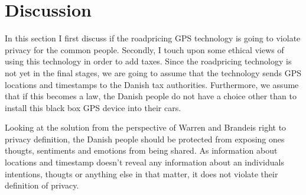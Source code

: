 \section{Discussion}
In this section I first discuss if the roadpricing GPS technology is going to violate privacy for the common people. Secondly, I touch upon some ethical views of using this technology in order to add taxes.
Since the roadpricing technology is not yet in the final stages, we are going to assume that the technology sends GPS locations and timestamps to the Danish tax authorities. Furthermore, we assume that if this becomes a law, the Danish people do not have a choice other than to install this black box GPS device into their cars. 

Looking at the solution from the perspective of Warren and Brandeis right to privacy definition, the Danish people should be protected from exposing ones thougts, sentiments and emotions from being shared. As information about locations and timestamp doesn't reveal any information about an individuals intentions, thougts or anything else in that matter, it does not violate their definition of privacy. 

